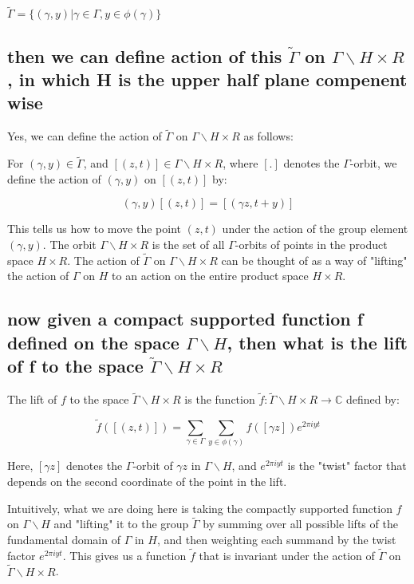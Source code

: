 \documentclass[12pt,a4paper,english]{article}
\theoremstyle{plain}
\theoremstyle{definition}
\theoremstyle{remark}
\begin{document}
$\tilde{\Gamma}=\{(\gamma,y)| \gamma\in \Gamma, y\in \phi(\gamma)\}$

\subsection{
then we can define action of this $\tilde{\Gamma}$ on $\Gamma\backslash H\times R$, in which H is the upper half plane compenent wise}

Yes, we can define the action of $\tilde{\Gamma}$ on $\Gamma\backslash H \times R$ as follows:

For $(\gamma, y) \in \tilde{\Gamma}$, and $[(z,t)] \in \Gamma \backslash H \times R$, where $[.]$ denotes the $\Gamma$-orbit, we define the action of $(\gamma, y)$ on $[(z,t)]$ by:

$$(\gamma, y) [(z,t)] = [(\gamma z, t+y)]$$

This tells us how to move the point $(z,t)$ under the action of the group element $(\gamma, y)$. The orbit $\Gamma \backslash H \times R$ is the set of all $\Gamma$-orbits of points in the product space $H \times R$. The action of $\tilde{\Gamma}$ on $\Gamma \backslash H \times R$ can be thought of as a way of "lifting" the action of $\Gamma$ on $H$ to an action on the entire product space $H \times R$.

\subsection{now given a compact supported function f defined on the space $\Gamma\backslash H$, then what is the lift of f to the space $\tilde{\Gamma}\backslash H \times R$}
The lift of $f$ to the space $\tilde{\Gamma}\backslash H \times R$ is the function $\tilde{f}:\tilde{\Gamma}\backslash H \times R \to \mathbb{C}$ defined by:

$$\tilde{f}([(z,t)]) = \sum_{\gamma \in \Gamma} \sum_{y \in \phi(\gamma)} f([\gamma z]) e^{2\pi i y t}$$

Here, $[\gamma z]$ denotes the $\Gamma$-orbit of $\gamma z$ in $\Gamma \backslash H$, and $e^{2\pi i y t}$ is the "twist" factor that depends on the second coordinate of the point in the lift.

Intuitively, what we are doing here is taking the compactly supported function $f$ on $\Gamma \backslash H$ and "lifting" it to the group $\tilde{\Gamma}$ by summing over all possible lifts of the fundamental domain of $\Gamma$ in $H$, and then weighting each summand by the twist factor $e^{2\pi i y t}$. This gives us a function $\tilde{f}$ that is invariant under the action of $\tilde{\Gamma}$ on $\tilde{\Gamma}\backslash H \times R$.
\end{document}
